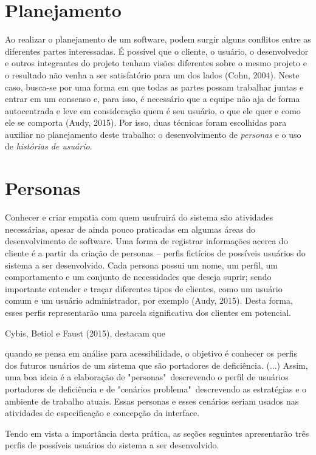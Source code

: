 \section{Planejamento}
Ao realizar o planejamento de um software, podem surgir alguns conflitos entre as diferentes partes interessadas. É possível que o cliente, o usuário, o desenvolvedor e outros integrantes do projeto tenham visões diferentes sobre o mesmo projeto e o resultado não venha a ser satisfatório para um dos lados (Cohn, 2004). Neste caso, busca-se por uma forma em que todas as partes possam trabalhar juntas e entrar em um consenso e, para isso, é necessário que a equipe não aja de forma autocentrada e leve em consideração quem é seu usuário, o que ele quer e como ele se comporta (Audy, 2015). Por isso, duas técnicas foram escolhidas para auxiliar no planejamento deste trabalho: o desenvolvimento de \textit{personas} e o uso de \textit{histórias de usuário}.


\section{Personas}

Conhecer e criar empatia com quem usufruirá do sistema são atividades necessárias, apesar de ainda pouco praticadas em algumas áreas do desenvolvimento de software. Uma forma de registrar informações acerca do cliente é a partir da criação de personas -- perfis fictícios de possíveis usuários do sistema a ser desenvolvido. Cada persona possui um nome, um perfil, um comportamento e um conjunto de necessidades que deseja suprir; sendo importante entender e traçar diferentes tipos de clientes, como um usuário comum e um usuário administrador, por exemplo (Audy, 2015). Desta forma, esses perfis representarão uma parcela significativa dos clientes em potencial.

Cybis, Betiol e Faust (2015)\nocite{ERGO2015}, destacam que
\begin{directcite}
    quando se pensa em análise para acessibilidade, o objetivo é conhecer os perfis dos futuros usuários de um sistema que são portadores de deficiência. (...) Assim, uma boa ideia é a elaboração de "personas"\ descrevendo o perfil de usuários portadores de deficiência e de "cenários problema"\ descrevendo as estratégias e o ambiente de trabalho atuais. 
    Essas personas e esses cenários seriam usados nas atividades de especificação e concepção da interface.
\end{directcite}
Tendo em vista a importância desta prática, as seções seguintes apresentarão três perfis de possíveis usuários do sistema a ser desenvolvido.

